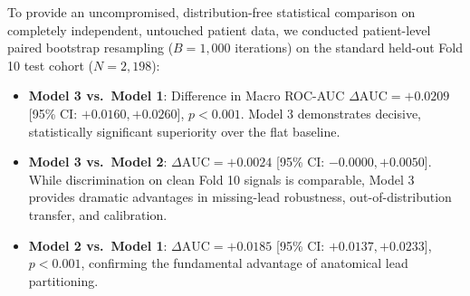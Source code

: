 \documentclass[5p,twocolumn,10pt]{elsarticle}
\begin{document}
To provide an uncompromised, distribution-free statistical comparison on completely independent, untouched patient data, we conducted patient-level paired bootstrap resampling ($B = 1,000$ iterations) on the standard held-out Fold 10 test cohort ($N = 2,198$):
\begin{itemize}
    \item \textbf{Model 3 vs.\ Model 1}: Difference in Macro ROC-AUC $\Delta \text{AUC} = \mathbf{+0.0209}$ [95\% CI: $\mathbf{+0.0160, +0.0260}$], $p < 0.001$. Model 3 demonstrates decisive, statistically significant superiority over the flat baseline.
    \item \textbf{Model 3 vs.\ Model 2}: $\Delta \text{AUC} = \mathbf{+0.0024}$ [95\% CI: $\mathbf{-0.0000, +0.0050}$]. While discrimination on clean Fold 10 signals is comparable, Model 3 provides dramatic advantages in missing-lead robustness, out-of-distribution transfer, and calibration.
    \item \textbf{Model 2 vs.\ Model 1}: $\Delta \text{AUC} = \mathbf{+0.0185}$ [95\% CI: $\mathbf{+0.0137, +0.0233}$], $p < 0.001$, confirming the fundamental advantage of anatomical lead partitioning.
\end{itemize}
\end{document}
